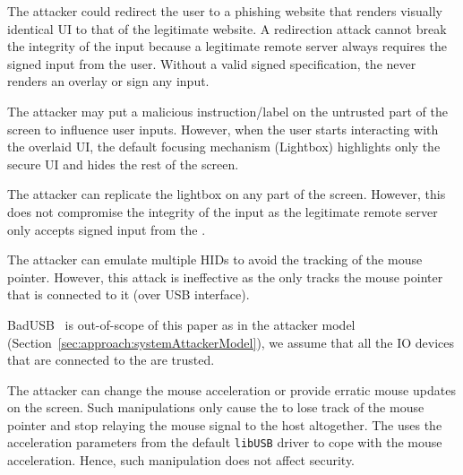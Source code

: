 \parasave
{} The attacker could redirect the user to a phishing website that renders visually identical UI to that of the legitimate website. A redirection attack cannot break the integrity of the input because a legitimate remote server always requires the signed input from the user. Without a valid signed specification, the \device never renders an overlay or sign any input. 

\parasave
{} The attacker may put a malicious instruction/label on the untrusted part of the screen to influence user inputs. However, when the user starts interacting with the overlaid UI, the default focusing mechanism (Lightbox) highlights only the secure UI and hides the rest of the screen. 

\parasave
{} The attacker can replicate the lightbox on any part of the screen. However, this does not compromise the integrity of the input as the legitimate remote server only accepts signed input from the \device. 

\parasave
{} The attacker can emulate multiple HIDs to avoid the tracking of the mouse pointer. However, this attack is ineffective as the \device only tracks the mouse pointer that is connected to it (over USB interface). 

\parasave
{} BadUSB~\cite{badUSB} is out-of-scope of this paper as in the attacker model (Section~\ref{sec:approach:systemAttackerModel}), we assume that all the IO devices that are connected to the \device are trusted.

\parasave
{} The attacker can change the mouse acceleration or provide erratic mouse updates on the screen. Such manipulations only cause the \device to lose track of the mouse pointer and stop relaying the mouse signal to the host altogether. The \device uses the acceleration parameters from the default \texttt{libUSB} driver to cope with the mouse acceleration. Hence, such manipulation does not affect security.

\parasave
{} 

